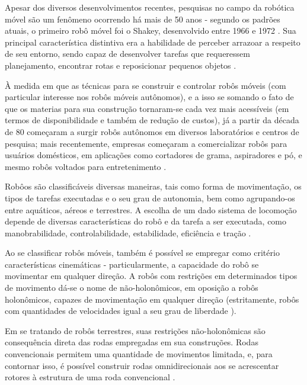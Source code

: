 

Apesar dos diversos desenvolvimentos recentes, pesquisas no campo da robótica móvel são um fenômeno ocorrendo há mais de 50 anos - segundo os padrões atuais, 
o primeiro robô móvel foi o Shakey, desenvolvido entre 1966 e 1972 \cite{TAKAHASHI}. 
Sua principal característica distintiva era a habilidade de perceber arrazoar a respeito de seu entorno, 
sendo capaz de desenvolver tarefas que requeressem planejamento, encontrar rotas e reposicionar pequenos objetos \cite{sri_international}.

À medida em que as técnicas para se construir e controlar robôs móveis (com particular interesse nos robôs móveis autônomos), 
e a isso se somando o fato de que os materias para sua construção tornaram-se cada vez mais acessíveis (em termos de disponibilidade 
e também de redução de custos), já a partir da década de 80 começaram a surgir robôs autônomos em diversos laboratórios e centros de pesquisa;
 mais recentemente, empresas começaram a comercializar robôs para usuários domésticos, em aplicações como cortadores de grama, aspiradores e pó, 
 e mesmo robôs voltados para entretenimento \cite{TAKAHASHI}.

Robôos são classificáveis diversas maneiras, tais como forma de movimentação, os tipos de tarefas executadas e o seu grau de autonomia, 
bem como agrupando-os entre aquáticos, aéreos e terrestres. A escolha de um dado sistema de locomoção depende de diversas características do robô e 
da tarefa a ser executada, como manobrabilidade, controlabilidade, estabilidade, eficiência e tração \cite{TAKAHASHI}.

Ao se classificar robôs móveis, também é possível se empregar como critério características cinemáticas - particularmente, 
a capacidade do robô se movimentar em qualquer direção. A robôs com restrições em determinados tipos de movimento dá-se o nome de não-holonômicos, 
em oposição a robôs holonômicos, capazes de movimentação em qualquer direção (estritamente, robôs com quantidades de velocidades igual a seu grau de liberdade \cite{TAKAHASHI}).

Em se tratando de robôs terrestres, suas restrições não-holonômicas são consequência direta das rodas empregadas em sua construções. 
Rodas convencionais permitem uma quantidade de movimentos limitada, e, para contornar isso, é possível construir rodas omnidirecionais aos se acrescentar rotores à estrutura de uma roda convencional \cite{TAKAHASHI}.
